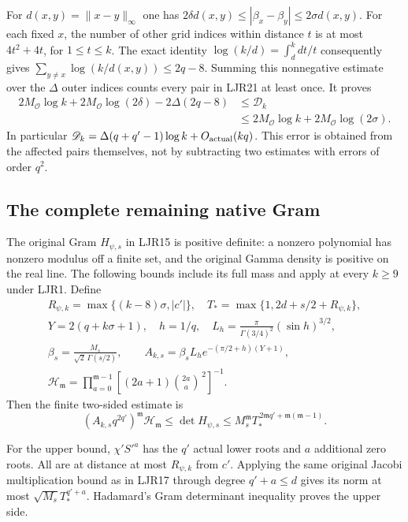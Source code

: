 \documentclass[11pt,a4paper]{article}
\begin{document}
For $d(x,y)=\|x-y\|_\infty$ one has
$2\delta d(x,y)\le|\beta_x-\beta_y|\le2\sigma d(x,y)$.
For each fixed $x$, the number of other grid indices within
distance $t$ is at most $4t^2+4t$, for $1\le t\le k$.
The exact identity
$\log(k/d)=\int_d^kdt/t$ consequently gives
$\sum_{y\ne x}\log(k/d(x,y))\le2q-8$.
Summing this nonnegative estimate over the $\Delta$ outer
indices counts every pair in LJR21 at least once. It proves
\[
 \begin{split}
 2M_{\mathcal O}\log k+2M_{\mathcal O}\log(2\delta)
                        -2\Delta(2q-8)
 &\le\mathscr D_k\\
 &\le2M_{\mathcal O}\log k+2M_{\mathcal O}\log(2\sigma).
 \end{split}\tag{LJR22}
\]
In particular
$\mathscr D_k=\Delta(q+q'-1)\log k+O_{\rm actual}(kq)$.
This error is obtained from the affected pairs themselves,
not by subtracting two estimates with errors of order $q^2$.

\subsection{The complete remaining native Gram}

The original Gram $H_{\psi,s}$ in LJR15 is positive definite:
a nonzero polynomial has nonzero modulus off a finite set,
and the original Gamma density is positive on the real line.
The following bounds include its full mass and apply at every
$k\ge9$ under LJR1. Define
\[
 \begin{gathered}
 R_{\psi,k}=\max\{(k-8)\sigma,|c'|\},\quad
 T_*=\max\{1,2d+s/2+R_{\psi,k}\},\\
 Y=2(q+k\sigma+1),\quad h=1/q,\quad
 L_h=\frac{\pi}{\Gamma(3/4)^2}(\sin h)^{3/2},\\
 \beta_s=\frac{M_s}{\sqrt2\,\Gamma(s/2)},\qquad
 A_{k,s}=\beta_s L_h e^{-(\pi/2+h)(Y+1)},\\
 \mathcal H_{\mathfrak m}
 =\prod_{a=0}^{\mathfrak m-1}
             [(2a+1)\binom{2a}{a}^{\,2}]^{-1}.
 \end{gathered}\tag{LJR23}
\]
Then the finite two-sided estimate is
\[
 (A_{k,s}q^{2q'})^{\mathfrak m}\mathcal H_{\mathfrak m}
 \le\det H_{\psi,s}
 \le M_s^{\mathfrak m}
                T_*^{\,2\mathfrak m q'+\mathfrak m(\mathfrak m-1)}.
 \tag{LJR24}
\]

For the upper bound, $\chi'S'^a$ has the $q'$ actual lower
roots and $a$ additional zero roots. All are at distance at
most $R_{\psi,k}$ from $c'$. Applying the same original Jacobi
multiplication bound as in LJR17 through degree $q'+a\le d$
gives its norm at most $\sqrt{M_s}T_*^{q'+a}$.
Hadamard's Gram determinant inequality proves the upper side.
\end{document}
